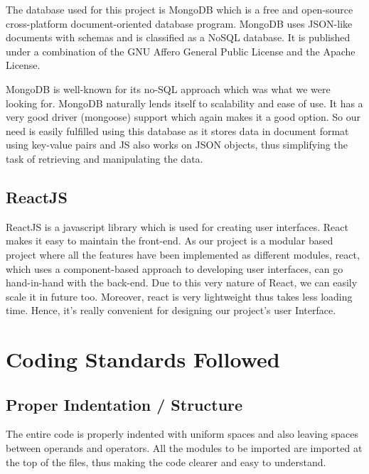 The database used for this project is MongoDB\cite{MongoDB} which is a free and open-source cross-platform document-oriented database program. MongoDB uses JSON-like documents with schemas and is classified as a NoSQL database. It is published under a combination of the GNU Affero General Public License and the Apache License.

MongoDB is well-known for its no-SQL approach which was what we were looking for. MongoDB naturally lends itself to scalability and ease of use. It has a very good driver (mongoose) support which again makes it a good option. So our need is easily fulfilled using this database as it stores data in document format using key-value pairs and JS also works on JSON objects, thus simplifying the task of retrieving and manipulating the data.

\subsection{ReactJS}
ReactJS\cite{ReactJS} is a javascript library which is used for creating user interfaces. React makes it easy to maintain the front-end. As our project is a modular based project where all the features have been implemented as different modules, react, which uses a component-based approach to developing user interfaces, can go hand-in-hand with the back-end. Due to this very nature of React, we can easily scale it in future too. Moreover, react is very lightweight thus takes less loading time. Hence, it’s really convenient for designing our project’s user Interface.



\section{Coding Standards Followed}

\subsection{Proper Indentation / Structure}
The entire code is properly indented with uniform spaces and also leaving spaces between operands and operators. All the modules to be imported are imported at the top of the files, thus making the code clearer and easy to understand.


